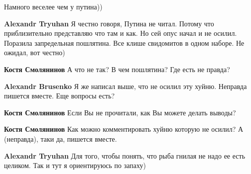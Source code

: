 \begin{itemize}
\begin{itemize}
Намного веселее чем у путина))

 
\textbf{Alexandr Tryuhan} Я честно говоря, Путина не читал. Потому что приблизительно представляю что там и как. Но сей опус начал и не осилил. Поразила запредельная пошлятина. Все клише свидомитов в одном наборе. Не ожидал, вот честно)

 
\textbf{Костя Смолянинов} А что не так? В чем пошлятина? Где есть не правда?

 
\textbf{Alexandr Brusenko} Я же написал выше, что не осилил эту хуйню. Неправда пишется вместе. Еще вопросы есть?

 
\textbf{Костя Смолянинов} Если Вы не прочитали, как Вы можете делать выводы?

 
\textbf{Костя Смолянинов} Как можно комментировать хуйню которую не осилил? А (неправда), таки да, пишется вместе.

 
\textbf{Alexandr Tryuhan} Для того, чтобы понять, что рыба гнилая не надо ее есть целиком. Так и тут я ориентируюсь по запаху)


\end{itemize}
\end{itemize}
